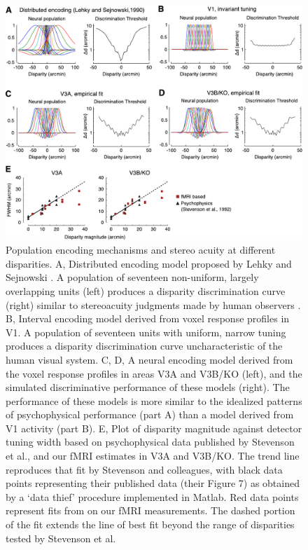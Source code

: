 \begin{figure}
  \centering
  \includegraphics[width=14cm, keepaspectratio]{fig11}
  \caption[Population encoding mechanisms and stereo acuity at different disparities.]{Population encoding mechanisms and stereo acuity at different disparities. A, Distributed encoding model proposed by Lehky and Sejnowski \cite{Lehky:1990fk}. A population of seventeen non-uniform, largely overlapping units (left) produces a disparity discrimination curve (right) similar to stereoacuity judgments made by human observers \cite{Badcock:1985ly}. B, Interval encoding model derived from voxel response profiles in V1. A population of seventeen units with uniform, narrow tuning produces a disparity discrimination curve uncharacteristic of the human visual system. C, D, A neural encoding model derived from the voxel response profiles in areas V3A and V3B/KO (left), and the simulated discriminative performance of these models (right). The performance of these models is more similar to the idealized patterns of psychophysical performance (part A) than a model derived from V1 activity (part B). E, Plot of disparity magnitude against detector tuning width based on psychophysical data published by Stevenson et al.\cite{Stevenson:1992kx}, and our fMRI estimates in V3A and V3B/KO. The trend line reproduces that fit by Stevenson and colleagues, with black data points representing their published data (their Figure 7) as obtained by a `data thief' procedure implemented in Matlab. Red data points represent fits from on our fMRI measurements. The dashed portion of the fit extends the line of best fit beyond the range of disparities tested by Stevenson et al.\cite{Stevenson:1992kx}}
  \label{fig:ch4fig11}
\end{figure}

